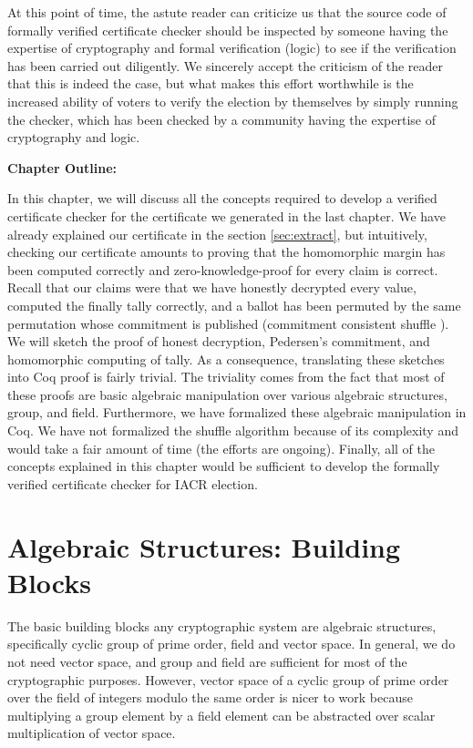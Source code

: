   
  
  At this point of time, the astute reader can criticize us that the source code of formally verified certificate checker should be 
  inspected by someone having the expertise of cryptography and formal verification (logic) 
  to see if the verification has been carried out diligently. We sincerely accept the criticism of the 
  reader that this is indeed the case, but what makes this effort  worthwhile is 
  the increased ability of voters to verify the election by themselves by 
  simply running the checker, which has been checked by a community having the 
  expertise of cryptography and logic. 

\textbf{Chapter Outline:} 



In this chapter, we will discuss all the concepts required to develop a verified certificate checker for the certificate we generated 
in the last chapter.  We have already explained our certificate in the section \ref{sec:extract}, but intuitively, 
checking our certificate amounts to proving that  the homomorphic margin has been computed correctly and zero-knowledge-proof for every claim is correct. 
Recall that our claims were that we have honestly decrypted every value, computed the finally tally correctly, and  
a ballot has been permuted by the same permutation whose commitment is published (commitment consistent shuffle \citep{Wikstrom:2009:CPS}).
We will sketch the proof of honest decryption, Pedersen's commitment, and homomorphic computing of 
tally. As a consequence, translating these sketches into Coq proof is fairly trivial. The triviality comes from 
the fact that most of these proofs are basic algebraic manipulation over various algebraic structures, 
group, and field. Furthermore, we have formalized these algebraic manipulation
in Coq. We have not formalized the shuffle algorithm \citep{Wikstrom:2009:CPS} because of 
its complexity and would take a fair amount of time (the efforts are ongoing).  Finally, all 
of the concepts explained in this chapter would be sufficient to develop the formally verified 
certificate checker for IACR election. 



\section{Algebraic Structures: Building Blocks}
The basic building blocks any cryptographic system are algebraic structures, specifically cyclic group of prime order, field and vector space. In general, 
we do not need vector space, and group and field are sufficient for most of the cryptographic purposes. However,
vector space  of a cyclic group of prime order over the field of integers modulo the same order is nicer to work 
because multiplying a group element by a field element can be abstracted over scalar multiplication of vector space.

